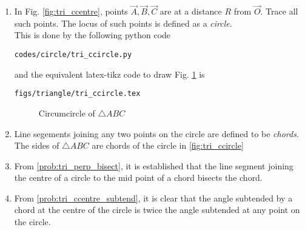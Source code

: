 \renewcommand{\theequation}{\theenumi}
\begin{enumerate}[label=\arabic*.,ref=\thesubsection.\theenumi]

\item In Fig. \ref{fig:tri_ccentre}, points $\vec{A}, \vec{B}, \vec{C}$  are at a distance $R$ from $\vec{O}$.  Trace all such points. The locus of such points is defined as a {\em circle}.
%
\\
\solution This is done by the following python code
%
\begin{lstlisting}
codes/circle/tri_ccircle.py
\end{lstlisting}
%
and the equivalent latex-tikz code to draw Fig. \ref{fig:tri_ccircle} is
%
\begin{lstlisting}
figs/triangle/tri_ccircle.tex
\end{lstlisting}

\begin{figure}[!ht]
	\begin{center}
		
		\resizebox{\columnwidth}{!}{}
	\end{center}
	\caption{Circumcircle of $\triangle ABC$}
	\label{fig:tri_ccircle}	
\end{figure}
%
\item Line segements joining any two points on the circle are defined to be {\em chords}. The sides of $\triangle ABC$ are chords of the circle in 	\eqref{fig:tri_ccircle}	

\item From  \eqref{prob:tri_perp_bisect}, it is established that the line segment joining the centre of a circle to the mid point of a chord bisects the chord.
\item From \eqref{prob:tri_ccentre_subtend}, it is clear that the angle subtended by a chord at the centre of the circle is twice the angle subtended at any point on the circle.

%

\end{enumerate}

